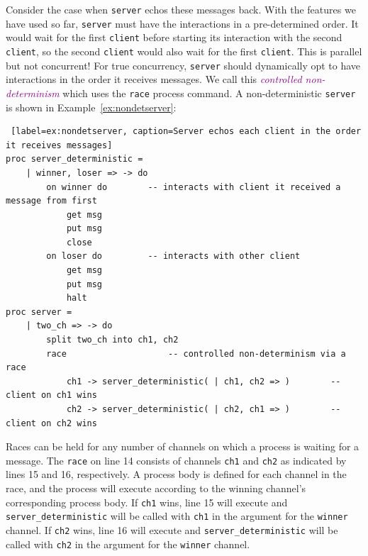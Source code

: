 \documentclass[11pt]{article}
\newcommand{\tc}[1]{\textcolor{darkMagenta}{\textit{#1}}}
\begin{document}
Consider the case when \lstinline$server$ echos these messages back.
With the features we have used so far, \lstinline$server$ must have the interactions in a pre-determined order.
It would wait for the first \lstinline$client$ before starting its interaction with the second \lstinline$client$, so the second \lstinline$client$ would also wait for the first \lstinline$client$. This is parallel but not concurrent!
For true concurrency, \lstinline$server$ should dynamically opt to have interactions in the order it receives messages. 
We call this \tc{controlled non-determinism} which uses the \lstinline$race$ process command.
A non-deterministic \lstinline$server$ is shown in Example~\ref{ex:nondetserver}:
\begin{lstlisting} [label=ex:nondetserver, caption=Server echos each client in the order it receives messages]
proc server_deterministic =
	| winner, loser => -> do
		on winner do		-- interacts with client it received a message from first
			get msg
			put msg
			close
		on loser do			-- interacts with other client
			get msg
			put msg
			halt
proc server =
	| two_ch => -> do
		split two_ch into ch1, ch2
		race					-- controlled non-determinism via a race
			ch1 -> server_deterministic( | ch1, ch2 => )		-- client on ch1 wins
			ch2 -> server_deterministic( | ch2, ch1 => )		-- client on ch2 wins
\end{lstlisting}
Races can be held for any number of channels on which a process is waiting for a message.
The \lstinline$race$ on line 14 consists of channels \lstinline$ch1$ and \lstinline$ch2$ as indicated by lines 15 and 16, respectively.
A process body is defined for each channel in the race, and the process will execute according to the winning channel's corresponding process body.
If \lstinline$ch1$ wins, line 15 will execute and \lstinline$server_deterministic$ will be called with \lstinline$ch1$ in the argument for the  \lstinline$winner$ channel.
If \lstinline$ch2$ wins, line 16 will execute and \lstinline$server_deterministic$ will be called with \lstinline$ch2$ in the argument for the \lstinline$winner$ channel.
\end{document}
